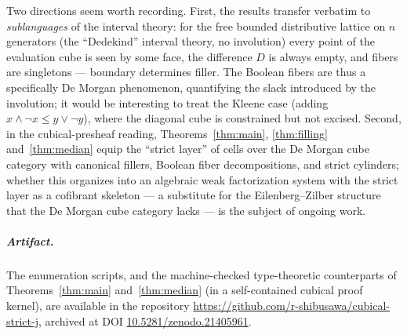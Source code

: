 \documentclass[11pt]{amsart}
\theoremstyle{definition}
\begin{document}
Two directions seem worth recording.  First, the results transfer
verbatim to \emph{sublanguages} of the interval theory: for the free
bounded distributive lattice on $n$ generators (the ``Dedekind''
interval theory, no involution) every point of the evaluation cube is
seen by some face, the difference $D$ is always empty, and fibers are
singletons --- boundary determines filler.  The Boolean fibers are
thus a specifically De Morgan phenomenon, quantifying the slack
introduced by the involution; it would be interesting to treat the
Kleene case (adding $x \wedge \neg x \le y \vee \neg y$), where the
diagonal cube is constrained but not excised.  Second, in the
cubical-presheaf reading, Theorems~\ref{thm:main},
\ref{thm:filling} and~\ref{thm:median} equip the ``strict layer'' of
cells over the De Morgan cube category with canonical fillers,
Boolean fiber decompositions, and strict cylinders; whether this
organizes into an algebraic weak factorization system with the
strict layer as a cofibrant skeleton --- a substitute for the
Eilenberg--Zilber structure that the De Morgan cube category lacks
--- is the subject of ongoing work.

\subparagraph*{Artifact.}  The enumeration scripts, and the
machine-checked type-theoretic counterparts of
Theorems~\ref{thm:main} and~\ref{thm:median} (in a self-contained
cubical proof kernel), are available in the repository
\url{https://github.com/r-shibusawa/cubical-strict-j}, archived at
DOI \href{https://doi.org/10.5281/zenodo.21405961}%
{10.5281/zenodo.21405961}.
\end{document}
